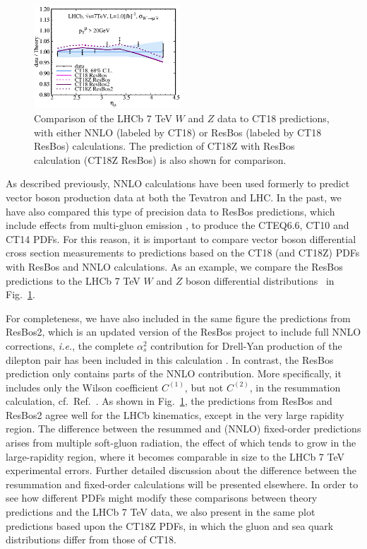 \begin{figure}[htb]
	\includegraphics[width=0.49\textwidth]{./fig/sec6/data_245_CT18__3-TcD_ect.pdf}
	\caption{Comparison of the LHCb 7 TeV $W$ and $Z$ data to CT18 predictions, with either NNLO (labeled by CT18) or ResBos (labeled by CT18 ResBos) calculations. The prediction of CT18Z with ResBos calculation (CT18Z ResBos) is also shown for comparison.  
		\label{fig:245_res}}
\end{figure}

As described previously, NNLO calculations have been used formerly to predict vector boson production data at both the Tevatron and LHC. 
In the past, we have also compared this type of precision data to ResBos predictions, which include effects from multi-gluon emission \cite{Balazs:1997xd}, to produce the CTEQ6.6, CT10 and CT14 PDFs.  
For this reason, it is important to compare vector boson differential cross section measurements to predictions based on the CT18 (and CT18Z) PDFs with ResBos and NNLO calculations.
As an example, we compare the ResBos predictions to the LHCb 7 TeV $W$ and $Z$ boson differential distributions~\cite{Aaij:2015gna} in Fig.~\ref{fig:245_res}. 

For completeness, we have also included in the same figure the predictions from ResBos2, which is an updated version of the ResBos project to include full NNLO corrections, {\it i.e.}, the complete $\alpha_s^2$ contribution for Drell-Yan production of the dilepton pair has been included in this calculation \cite{resbos2-paper}. 
In contrast, the ResBos prediction only contains parts of the NNLO contribution. More specifically, it includes only the Wilson coefficient $C^{(1)}$, but not $C^{(2)}$, in the resummation calculation, cf.~Ref.~\cite{Balazs:1997xd}. 
As shown in Fig.~\ref{fig:245_res}, the predictions from ResBos and ResBos2 agree well for the LHCb kinematics, except in the very large rapidity region. 
The difference between the resummed and (NNLO) fixed-order predictions arises from multiple soft-gluon radiation, the effect of which tends to grow in the large-rapidity
region, where it becomes comparable in size to the LHCb 7 TeV experimental errors. Further detailed discussion about the difference between the resummation and fixed-order calculations will be presented elsewhere. 
In order to see how different PDFs might modify these comparisons between theory predictions and the LHCb 7 TeV data, we also present in the same plot predictions based upon the CT18Z PDFs, in which the gluon and sea quark distributions differ from those of CT18.

